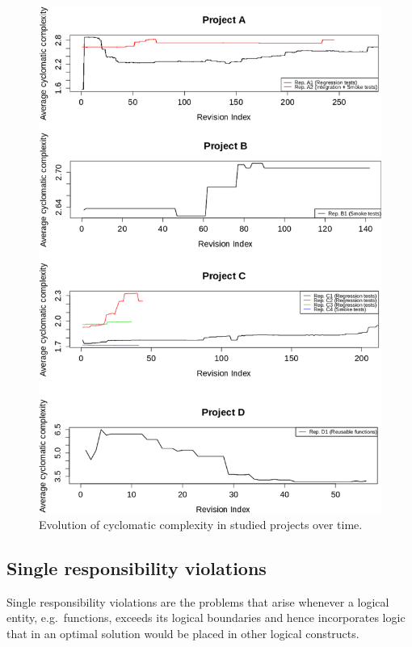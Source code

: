 \begin{figure}[!htbp]
    \centering
    \includegraphics[width=\textwidth,keepaspectratio]{figure/results/rq1/avg-complexity-together.pdf}
    \caption{Evolution of cyclomatic complexity in studied projects over time.}
    \label{fig:avg-complexity-together}
\end{figure}


\subsection{Single responsibility violations}
    Single responsibility violations are the problems that arise whenever a logical entity, e.g.\ functions, exceeds its logical boundaries and hence incorporates logic that in an optimal solution would be placed in other logical constructs.
    
